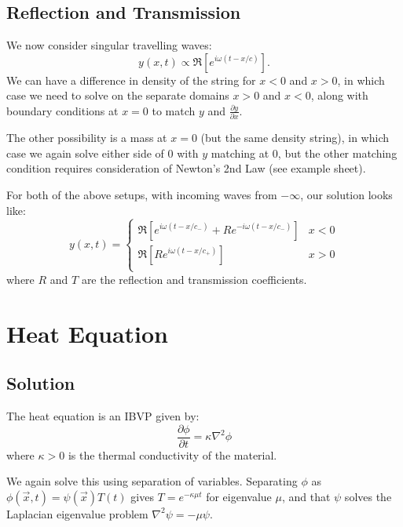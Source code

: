 \documentclass[../Main.tex]{subfiles}
\begin{document}
\subsection{Reflection and Transmission}
We now consider singular travelling waves:
\begin{equation*}
    y(x, t) \propto \Re\left[e^{i\omega(t - x / c)}\right].
\end{equation*}
We can have a difference in density of the string for $x < 0$ and $x > 0$, in which case we need to solve on the separate domains $x > 0$ and $x < 0$, along with boundary conditions at $x = 0$ to match $y$ and $\frac{\partial y}{\partial x}$.

The other possibility is a mass at $x = 0$ (but the same density string), in which case we again solve either side of $0$ with $y$ matching at $0$, but the other matching condition requires consideration of Newton's 2nd Law (see example sheet). %

For both of the above setups, with incoming waves from $-\infty$, our solution looks like:
\begin{equation*}
    y(x, t) =
    \begin{cases}
        \Re\left[e^{i\omega(t - x / c_-)} + Re^{-i\omega(t - x / c_-)}\right] & x < 0 \\
        \Re\left[Re^{i\omega(t - x / c_+)}\right] & x > 0 \\
    \end{cases}
\end{equation*}
where $R$ and $T$ are the reflection and transmission coefficients.
\section{Heat Equation}
\subsection{Solution}
The heat equation is an IBVP given by:
\begin{equation*}
    \frac{\partial \phi}{\partial t} = \kappa \nabla^2 \phi
\end{equation*}
where $\kappa > 0$ is the thermal conductivity of the material.

We again solve this using separation of variables. Separating $\phi$ as $\phi(\vec{x}, t) = \psi(\vec{x}) T(t)$ gives $T = e^{-\kappa \mu t}$ for eigenvalue $\mu$, and that $\psi$ solves the Laplacian eigenvalue problem $\nabla^2 \psi = -\mu \psi$.
\end{document}
